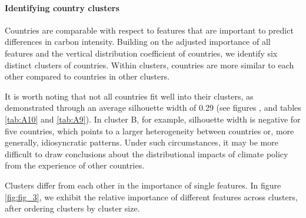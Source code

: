 \documentclass[12pt, a4paper]{article}
\begin{document}
\clearpage

\paragraph{Identifying country clusters}

Countries are comparable with respect to features that are important to predict differences in carbon intensity. Building on the adjusted importance of all features and the vertical distribution coefficient of countries, we identify six distinct clusters of countries. Within clusters, countries are more similar to each other compared to countries in other clusters. 

It is worth noting that not all countries fit well into their clusters, as demonstrated through an average silhouette width of 0.29 (see figures ,  and tables \ref{tab:A10} and \ref{tab:A9}). In cluster B, for example, silhouette width is negative for five countries, which points to a larger heterogeneity between countries or, more generally, idiosyncratic patterns. Under such circumstances, it may be more difficult to draw conclusions about the distributional impacts of climate policy from the experience of other countries. 

Clusters differ from each other in the importance of single features. In figure \ref{fig:fig_3}, we exhibit the relative importance of different features across clusters, after ordering clusters by cluster size. 
\end{document}
